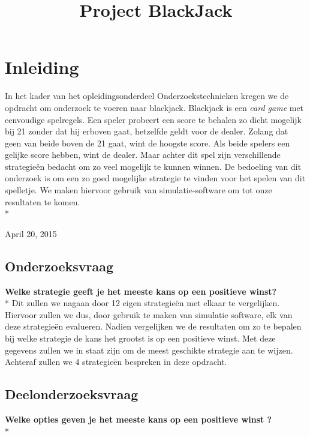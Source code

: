 \documentclass[conference]{IEEEtran}
\begin{document}
\title{Project BlackJack}
\author{
}
\maketitle

\IEEEpeerreviewmaketitle

\section{Inleiding}
In het kader van het opleidingsonderdeel Onderzoekstechnieken kregen we de opdracht om onderzoek te voeren naar blackjack. Blackjack is een {\it card game} met eenvoudige spelregels. Een speler probeert een score te behalen zo dicht mogelijk bij 21 zonder dat hij erboven gaat, hetzelfde geldt voor de dealer. Zolang dat geen van beide boven de 21 gaat, wint de hoogste score. Als beide spelers een gelijke score hebben, wint de dealer.
Maar achter dit spel zijn verschillende strategie\"en bedacht om zo veel mogelijk te kunnen winnen. De bedoeling van dit onderzoek is om een zo goed mogelijke strategie te vinden voor het spelen van dit spelletje. We maken hiervoor gebruik van simulatie-software om tot onze resultaten te komen.\\*
 
\hfill April 20, 2015

\subsection{Onderzoeksvraag}
\textbf{Welke strategie geeft je het meeste kans op een positieve winst?}\\*
Dit zullen we nagaan door 12 eigen strategie\"en met elkaar te vergelijken.
Hiervoor zullen we dus, door gebruik te maken van simulatie software, elk van deze strategie\"en evalueren.
Nadien vergelijken we de resultaten om zo te bepalen bij welke strategie de kans het grootst is op een positieve winst. Met deze gegevens zullen we in staat zijn om de meest geschikte strategie aan te wijzen.
Achteraf zullen we 4 strategie\"en bespreken in deze opdracht.

\subsection{Deelonderzoeksvraag} 
\textbf{Welke opties geven je het meeste kans op een positieve winst ?} \\*
\end{document}

